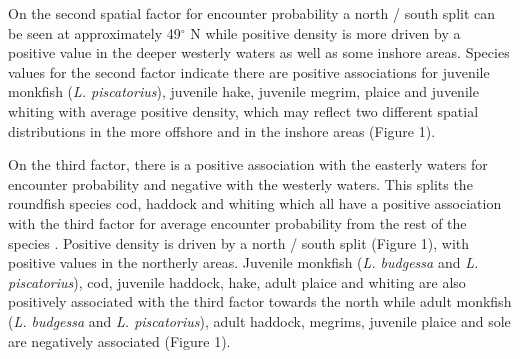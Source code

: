 \documentclass{nature}
\begin{document}
\begin{linenumbers}
On the second spatial factor for encounter probability a north / south split
can be seen at approximately 49$^{\circ}$ N while positive density is more
driven by a positive value in the deeper westerly waters as well as some
inshore areas. Species values for the second factor indicate there are
positive associations for juvenile monkfish (\emph{L. piscatorius}), juvenile
hake, juvenile megrim, plaice and juvenile whiting with average positive
density, which may reflect two different spatial distributions in the more
offshore and in the inshore areas (Figure 1).

On the third factor, there is a positive association with the easterly waters
for encounter probability and negative with the westerly waters. This
 splits the
roundfish species cod, haddock and whiting which all have a positive
association with the third factor for average encounter probability from the
rest of the species .
Positive density is driven by a north / south split (Figure 1), with positive
values in the northerly areas. Juvenile monkfish (\emph{L.  budgessa} and
\emph{L. piscatorius}), cod, juvenile haddock, hake, adult plaice and whiting
are also positively associated with the third factor towards the north while
adult monkfish (\emph{L. budgessa} and \emph{L.  piscatorius}), adult haddock,
megrims, juvenile plaice and sole are negatively associated  (Figure 1).

    


\end{linenumbers}
\end{document}
